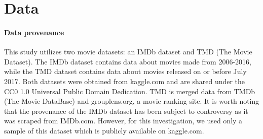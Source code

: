 \section{Data}

    \paragraph{Data provenance}
        This study utilizes two movie datasets: an IMDb dataset\cite*{data:IMDb} and TMD\cite*{data:TMD} (The Movie Dataset).
        The IMDb dataset contains data about movies made from 2006-2016, while the TMD dataset contains data about movies released on or before July 2017.
        Both datasets were obtained from kaggle.com and are shared under the CC0 1.0 Universal Public Domain Dedication.
        TMD is merged data from TMDb (The Movie DataBase) and grouplens.org, a movie ranking site.
        It is worth noting that the provenance of the IMDb dataset has been subject to controversy as it was scraped from IMDb.com.
        However, for this investigation, we used only a sample of this dataset which is publicly available on kaggle.com.

